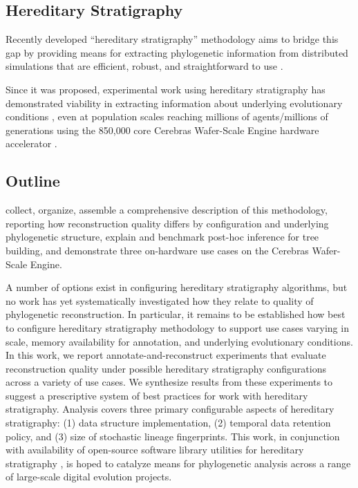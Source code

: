 \subsection{Hereditary Stratigraphy}

Recently developed ``hereditary stratigraphy'' methodology aims to bridge this gap by providing means for extracting phylogenetic information from distributed simulations that are efficient, robust, and straightforward to use \citep{moreno2022hereditary}.

Since it was proposed, experimental work using hereditary stratigraphy has demonstrated viability in extracting information about underlying evolutionary conditions \citep{moreno2024ecology}, even at population scales reaching millions of agents/millions of generations using the 850,000 core Cerebras Wafer-Scale Engine hardware accelerator \citep{moreno2024trackable}.

\subsection{Outline}

collect, organize, assemble a comprehensive description of this methodology, reporting how reconstruction quality differs by configuration and underlying phylogenetic structure, explain and benchmark post-hoc inference for tree building, and demonstrate three on-hardware use cases on the Cerebras Wafer-Scale Engine.

A number of options exist in configuring hereditary stratigraphy algorithms, but no work has yet systematically investigated how they relate to quality of phylogenetic reconstruction.
In particular, it remains to be established how best to configure hereditary stratigraphy methodology to support use cases varying in scale, memory availability for annotation, and underlying evolutionary conditions.
In this work, we report annotate-and-reconstruct experiments that evaluate reconstruction quality under possible hereditary stratigraphy configurations across a variety of use cases.
We synthesize results from these experiments to suggest a prescriptive system of best practices for work with hereditary stratigraphy.
Analysis covers three primary configurable aspects of hereditary stratigraphy: (1) data structure implementation, (2) temporal data retention policy, and (3) size of stochastic lineage fingerprints.
This work, in conjunction with availability of open-source software library utilities for hereditary stratigraphy \citep{moreno2022hstrat}, is hoped to catalyze means for phylogenetic analysis across a range of large-scale digital evolution projects.


